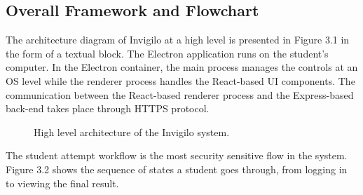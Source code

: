 \documentclass[12pt, a4paper]{report}
\begin{document}
\subsection{Overall Framework and Flowchart}

\begin{justify}
  {\fontsize{12}{18}\selectfont
    The architecture diagram of Invigilo at a high level is presented in Figure 3.1 in the form of a textual block. The Electron application runs on the student’s computer. In the Electron container, the main process manages the controls at an OS level while the renderer process handles the React-based UI components. The communication between the React-based renderer process and the Express-based back-end takes place through HTTPS protocol.
  }
\end{justify}

\begin{figure}[H]
  \centering
  \caption{High level architecture of the Invigilo system.}
  \label{fig:3.1}
\end{figure}

\begin{justify}
  {\fontsize{12}{18}\selectfont
    The student attempt workflow is the most security sensitive flow in the system. Figure 3.2 shows the sequence of states a student goes through, from logging in to viewing the final result.
  }
\end{justify}
\end{document}
